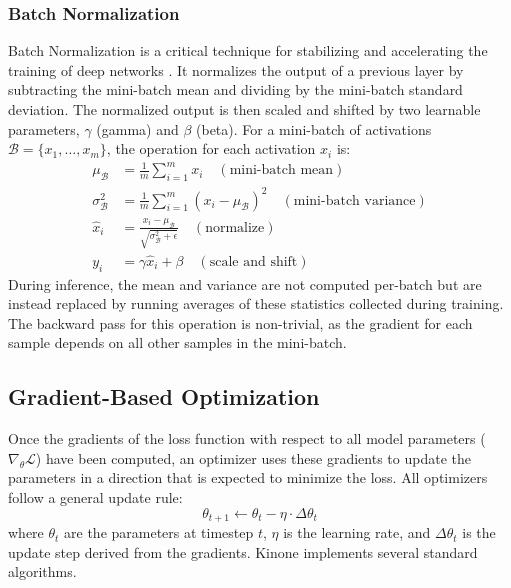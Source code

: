 \documentclass[a4paper]{article}
\begin{document}
\subsubsection{Batch Normalization}
Batch Normalization is a critical technique for stabilizing and accelerating the training of deep networks \cite{ioffe2015batch}. It normalizes the output of a previous layer by subtracting the mini-batch mean and dividing by the mini-batch standard deviation. The normalized output is then scaled and shifted by two learnable parameters, $\gamma$ (gamma) and $\beta$ (beta). For a mini-batch of activations $\mathcal{B} = \{x_1, \dots, x_m\}$, the operation for each activation $x_i$ is:
\begin{align*}
    \mu_{\mathcal{B}} &= \frac{1}{m} \sum_{i=1}^{m} x_i \quad (\text{mini-batch mean}) \\
    \sigma^2_{\mathcal{B}} &= \frac{1}{m} \sum_{i=1}^{m} (x_i - \mu_{\mathcal{B}})^2 \quad (\text{mini-batch variance}) \\
    \hat{x}_i &= \frac{x_i - \mu_{\mathcal{B}}}{\sqrt{\sigma^2_{\mathcal{B}} + \epsilon}} \quad (\text{normalize}) \\
    y_i &= \gamma \hat{x}_i + \beta \quad (\text{scale and shift})
\end{align*}
During inference, the mean and variance are not computed per-batch but are instead replaced by running averages of these statistics collected during training. The backward pass for this operation is non-trivial, as the gradient for each sample depends on all other samples in the mini-batch.

\subsection{Gradient-Based Optimization}

Once the gradients of the loss function with respect to all model parameters ($\nabla_{\theta} \mathcal{L}$) have been computed, an optimizer uses these gradients to update the parameters in a direction that is expected to minimize the loss. All optimizers follow a general update rule:
\begin{equation}
    \theta_{t+1} \leftarrow \theta_t - \eta \cdot \Delta \theta_t
\end{equation}
where $\theta_t$ are the parameters at timestep $t$, $\eta$ is the learning rate, and $\Delta \theta_t$ is the update step derived from the gradients. Kinone implements several standard algorithms.
\end{document}
